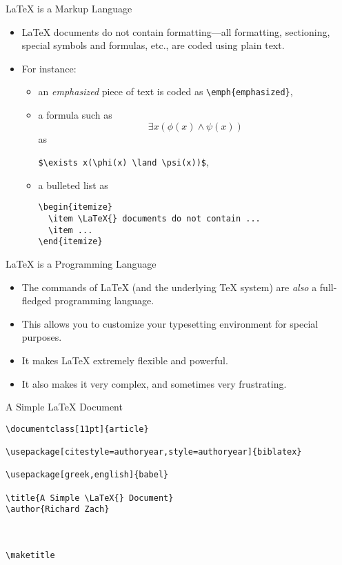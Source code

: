 \begin{frame}[fragile]{\LaTeX{} is a Markup Language}

\begin{itemize}
\item \LaTeX{} documents do not contain formatting---all formatting,
  sectioning, special symbols and formulas, etc., are coded using
  plain text.
\item For instance:
  \begin{itemize}
    \item an \emph{emphasized} piece of text is coded as
      \verb+\emph{emphasized}+,
    \item a formula such as \[\exists x(\phi(x) \land \psi(x))\] as
      \begin{center}
      \verb+$\exists x(\phi(x) \land \psi(x))$+,
      \end{center}
    \item a bulleted list as 
\begin{verbatim}
\begin{itemize}
  \item \LaTeX{} documents do not contain ...
  \item ...
\end{itemize}
\end{verbatim}
  \end{itemize}
\end{itemize}

\end{frame}

\begin{frame}{\LaTeX{} is a Programming Language}

\begin{itemize}
\item The commands of \LaTeX{} (and the underlying \TeX{} system) are
  \emph{also} a full-fledged programming language.
\item This allows you to customize your typesetting environment for
  special purposes.
\item It makes \LaTeX{} extremely flexible and powerful.
\item It also makes it very complex, and sometimes very frustrating.
\end{itemize}
\end{frame}

\begin{frame}[fragile]{A Simple \LaTeX{} Document}

\begin{verbatim}
\documentclass[11pt]{article}

\usepackage[citestyle=authoryear,style=authoryear]{biblatex}

\usepackage[greek,english]{babel}

\title{A Simple \LaTeX{} Document}
\author{Richard Zach}



\maketitle
\end{verbatim}
\end{frame}

